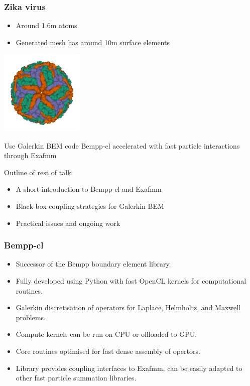 \documentclass[dvipsnames,10pt]{beamer}
\begin{document}
\begin{frame}
    \frametitle{Zika virus}
    \begin{minipage}{6cm}
        \begin{itemize}
            \item Around 1.6m atoms
            \item Generated mesh has around 10m surface elements
        \end{itemize}
    \end{minipage}
    \begin{minipage}{4cm}
        \includegraphics[width=4cm]{../figs/6CO8_assembly.png}
    \end{minipage}

\begin{tcolorbox}
    Use Galerkin BEM code Bempp-cl accelerated with fast particle interactions through Exafmm
\end{tcolorbox}

Outline of rest of talk:
\begin{itemize}
    \item A short introduction to Bempp-cl and Exafmm
    \item Black-box coupling strategies for Galerkin BEM
    \item Practical issues and ongoing work
\end{itemize}

\end{frame}

\begin{frame}
    \frametitle{Bempp-cl}
    \begin{itemize}
        \item Successor of the Bempp boundary element library.
        \item Fully developed using Python with fast OpenCL kernels for computational routines.
        \item Galerkin discretisation of operators for Laplace, Helmholtz, and Maxwell problems.
        \item Compute kernels can be run on CPU or offloaded to GPU.
        \item Core routines optimised for fast dense assembly of opertors.
        \item Library provides coupling interfaces to Exafmm, can be easily adapted to other
            fast particle summation libraries.
    \end{itemize}
\end{frame}
\end{document}
